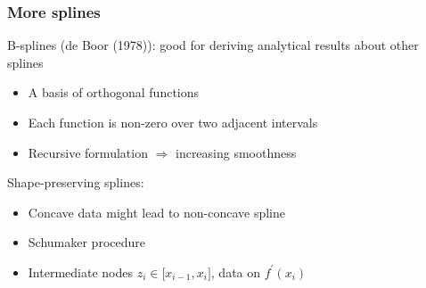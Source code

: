 \documentclass[bigger]{beamer}
\begin{document}
\begin{frame}%

\frametitle{More splines}

B-splines (de Boor (1978)): good for deriving analytical results about other splines

\begin{itemize}
\item A basis of orthogonal functions

\item Each function is non-zero over two adjacent intervals

\item Recursive formulation $\Rightarrow $ increasing smoothness\bigskip
\end{itemize}

Shape-preserving splines:

\begin{itemize}
\item Concave data might lead to non-concave spline

\item Schumaker procedure

\item Intermediate nodes $z_{i}\in \lbrack x_{i-1},x_{i}]$, data on $%
f^{\prime }(x_{i})$
\end{itemize}


\end{frame}%
\end{document}
